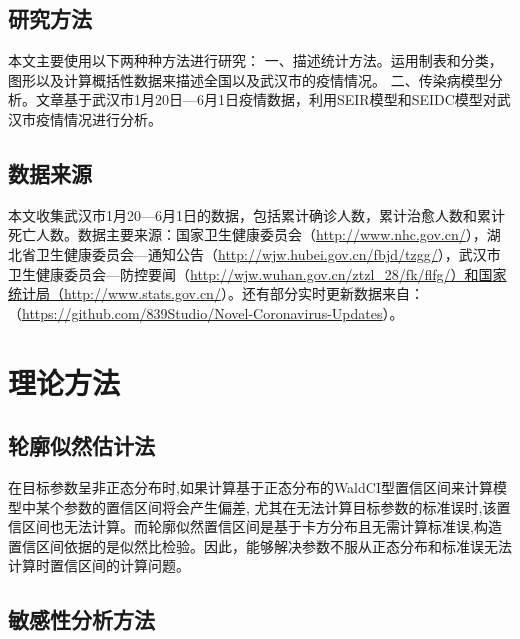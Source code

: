\documentclass[12pt,hyperref,]{ctexart}
\begin{document}
\hypertarget{ux7814ux7a76ux65b9ux6cd5}{%
\subsection{研究方法}\label{ux7814ux7a76ux65b9ux6cd5}}

本文主要使用以下两种种方法进行研究：
一、描述统计方法。运用制表和分类，图形以及计算概括性数据来描述全国以及武汉市的疫情情况。
二、传染病模型分析。文章基于武汉市1月20日---6月1日疫情数据，利用SEIR模型和SEIDC模型对武汉市疫情情况进行分析。

\hypertarget{ux6570ux636eux6765ux6e90}{%
\subsection{数据来源}\label{ux6570ux636eux6765ux6e90}}

本文收集武汉市1月20---6月1日的数据，包括累计确诊人数，累计治愈人数和累计死亡人数。数据主要来源：国家卫生健康委员会（\url{http://www.nhc.gov.cn/}），湖北省卫生健康委员会---通知公告（\url{http://wjw.hubei.gov.cn/fbjd/tzgg/}），武汉市卫生健康委员会---防控要闻（\url{http://wjw.wuhan.gov.cn/ztzl_28/fk/flfg/）和国家统计局（http://www.stats.gov.cn/}）。还有部分实时更新数据来自：（\url{https://github.com/839Studio/Novel-Coronavirus-Updates}）。

\hypertarget{ux7406ux8bbaux65b9ux6cd5}{%
\section{理论方法}\label{ux7406ux8bbaux65b9ux6cd5}}

\hypertarget{ux8f6eux5ed3ux4f3cux7136ux4f30ux8ba1ux6cd5}{%
\subsection{轮廓似然估计法}\label{ux8f6eux5ed3ux4f3cux7136ux4f30ux8ba1ux6cd5}}

在目标参数呈非正态分布时,如果计算基于正态分布的WaldCI型置信区间来计算模型中某个参数的置信区间将会产生偏差,
尤其在无法计算目标参数的标准误时,该置信区间也无法计算。而轮廓似然置信区间是基于卡方分布且无需计算标准误,构造置信区间依据的是似然比检验。因此，能够解决参数不服从正态分布和标准误无法计算时置信区间的计算问题。

\hypertarget{ux654fux611fux6027ux5206ux6790ux65b9ux6cd5}{%
\subsection{敏感性分析方法}\label{ux654fux611fux6027ux5206ux6790ux65b9ux6cd5}}
\end{document}
